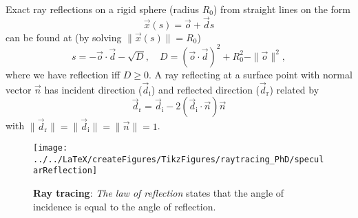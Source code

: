 Exact ray reflections on a rigid sphere (radius $R_0$) from straight lines on the form
\begin{equation*}
	\vec{x}(s) = \vec{o} + \vec{d}s
\end{equation*}
can be found at (by solving $\|\vec{x}(s)\| = R_0$)
\begin{equation*}
	s = -\vec{o}\cdot \vec{d} - \sqrt{D},\quad D = (\vec{o}\cdot \vec{d})^2 + R_0^2-\|\vec{o}\|^2,
\end{equation*}
where we have reflection iff $D\geq 0$. A ray reflecting at a surface point with normal vector $\vec{n}$ has incident direction ($\vec{d}_{\mathrm{i}}$) and reflected direction ($\vec{d}_{\mathrm{r}}$) related by
\begin{equation*}
	\vec{d}_{\mathrm{r}} = \vec{d}_{\mathrm{i}} - 2(\vec{d}_{\mathrm{i}}\cdot\vec{n})\vec{n}
\end{equation*}
with $\|\vec{d}_{\mathrm{r}}\| = \|\vec{d}_{\mathrm{i}}\| = \|\vec{n}\| = 1$.
\begin{figure}
	\centering
	\texttt{[image: ../../LaTeX/createFigures/TikzFigures/raytracing\_PhD/specularReflection]}
	\caption{\textbf{Ray tracing}: \textit{The law of reflection} states that the angle of incidence is equal to the angle of reflection.}
\end{figure}

